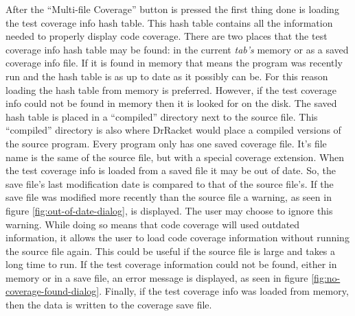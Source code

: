 After the ``Multi-file Coverage'' button is pressed the first thing done is loading the test coverage info hash table. This hash table contains all the information needed to properly display code coverage. There are two places that the test coverage info hash table may be found: in the current \emph{tab's} memory or as a saved coverage info file. If it is found in memory that means the program was recently run and the hash table is as up to date as it possibly can be. For this reason loading the hash table from memory is preferred. However, if the test coverage info could not be found in memory then it is looked for on the disk. The saved hash table is placed in a ``compiled'' directory next to the source file. This ``compiled'' directory is also where DrRacket would place a compiled versions of the source program. Every program only has one saved coverage file. It's file name is the same of the source file, but with a special coverage extension. When the test coverage info is loaded from a saved file it may be out of date. So, the save file's last modification date is compared to that of the source file's. If the save file was modified more recently than the source file a warning, as seen in figure \ref{fig:out-of-date-dialog}, is displayed. The user may choose to ignore this warning. While doing so means that code coverage will used outdated information, it allows the user to load code coverage information without running the source file again. This could be useful if the source file is large and takes a long time to run. If the test coverage information could not be found, either in memory or in a save file, an error message is displayed, as seen in figure \ref{fig:no-coverage-found-dialog}. Finally, if the test coverage info was loaded from memory, then the data is written to the coverage save file.



